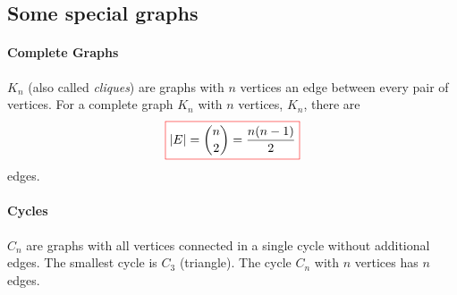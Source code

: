 \subsection{Some special graphs}
\paragraph{Complete Graphs} \(K_n\) (also called \emph{cliques}) are graphs with \(n\) vertices an edge between every pair of vertices.
For a complete graph \(K_n\) with \(n\) vertices, \(K_n\), there are 
\[\fcolorbox{red}{white}{$\displaystyle
|E| = \binom{n}{2} = \frac{n(n-1)}{2}
$}\]
edges.

\paragraph{Cycles} \(C_n\) are graphs with all vertices connected in a single cycle without additional edges.
The smallest cycle is \(C_3\) (triangle).
The cycle \(C_n\) with \(n\) vertices has \(n\) edges.


